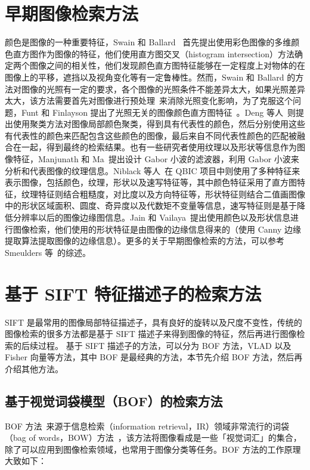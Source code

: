 \section{早期图像检索方法}
颜色是图像的一种重要特征，Swain 和 Ballard~\cite{Swain1991ColorI} 首先提出使用彩色图像的多维颜色直方图作为图像的特征，他们使用直方图交叉（histogram intersection）方法确定两个图像之间的相关性，他们发现颜色直方图特征能够在一定程度上对物体的在图像上的平移，遮挡以及视角变化等有一定鲁棒性。然而，Swain 和 Ballard 的方法对图像的光照有一定的要求，各个图像的光照条件不能差异太大，如果光照差异太大，该方法需要首先对图像进行预处理~\cite{Forsyth1990ANA}来消除光照变化影响，为了克服这个问题，Funt 和 Finlayson 提出了光照无关的图像颜色直方图特征~\cite{Funt1995ColorCC}。Deng 等人~\cite{Deng2001AnEC}则提出使用聚类方法对图像局部颜色聚类，得到具有代表性的颜色，然后分别使用这些有代表性的颜色来匹配包含这些颜色的图像，最后来自不同代表性颜色的匹配被融合在一起，得到最终的检索结果。也有一些研究者使用纹理以及形状等信息作为图像特征，Manjunath 和 Ma~\cite{Manjunath1996TextureFF}提出设计 Gabor 小波的滤波器，利用 Gabor 小波来分析和代表图像的纹理信息。Niblack 等人~\cite{Niblack1993TheQP}在 QBIC 项目中则使用了多种特征来表示图像，包括颜色，纹理，形状以及速写特征等，其中颜色特征采用了直方图特征，纹理特征则结合粗糙度，对比度以及方向特征等，形状特征则结合二值画图像中的形状区域面积、圆度、奇异度以及代数矩不变量等信息，速写特征则是基于降低分辨率以后的图像边缘图信息。Jain 和 Vailaya~\cite{Jain1996ImageRU}提出使用颜色以及形状信息进行图像检索，他们使用的形状特征是由图像的边缘信息得来的（使用 Canny 边缘提取算法提取图像的边缘信息）。更多的关于早期图像检索的方法，可以参考 Smeulders 等~\cite{Smeulders2000ContentBasedIR}的综述。


\section{基于 SIFT 特征描述子的检索方法}
SIFT 是最常用的图像局部特征描述子，具有良好的旋转以及尺度不变性，传统的图像检索的很多方法都是基于 SIFT 描述子来得到图像的特征，然后再进行图像检索的后续过程。 基于 SIFT 描述子的方法，可以分为 BOF 方法，VLAD 以及 Fisher 向量等方法，其中 BOF 是最经典的方法，本节先介绍 BOF 方法，然后再介绍其他方法。


\subsection{基于视觉词袋模型（BOF）的检索方法}
BOF 方法~\cite{OHara2011IntroductionTT,Nowak2006SamplingSF,Yang2007EvaluatingBR}来源于信息检索（information retrieval，IR）领域非常流行的词袋（bag of words，BOW）方法~\cite{manning2008introduction,Salton1975AVS}，该方法将图像看成是一些「视觉词汇」的集合，除了可以应用到图像检索领域，也常用于图像分类等任务。BOF 方法的工作原理大致如下：

